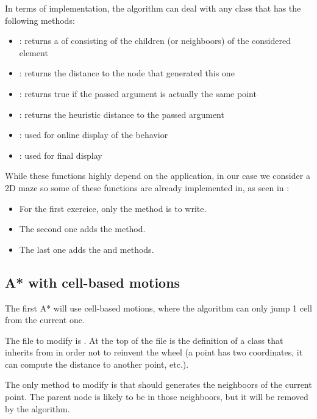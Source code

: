 \documentclass{ecnreport}
\begin{document}
In terms of implementation, the algorithm can deal with any  class that has the following methods:
\begin{itemize}
 \item {}: returns a  of  consisting of the children (or neighboors) of the considered
 element
 \item {}: returns the distance to the node that generated this one
 \item {}: returns true if the passed argument is actually the same point
 \item {}: returns the heuristic distance to the passed argument
 \item {}: used for online display of the behavior
 \item {}: used for final display
\end{itemize}


While these functions highly depend on the application, in our case we consider a 2D maze so some of these functions are already implemented in, as seen in :
\begin{itemize}
 \item For the first exercice, only the  method is to write.
 \item The second one adds the  method.
 \item The last one adds the  and  methods.
\end{itemize}



\subsection{A* with cell-based motions}

The first A* will use cell-based motions, where the algorithm can only jump 1 cell from the current one.

The file to modify is .
At the top of the file is the definition of a  class
that inherits from  in order not to reinvent the wheel (a point has two coordinates, it can compute the distance to
another point, etc.).

The only method to modify is  that should generates the neighboors of the current point.
The parent node is likely to be in those neighboors, but it will be removed by the algorithm. 
\end{document}
